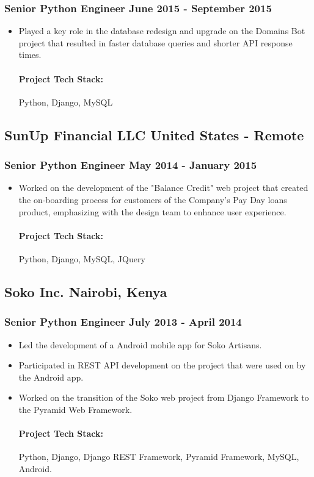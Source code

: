 \documentclass[11pt]{article} %
\begin{document}
\subsubsection{Senior Python Engineer \hfill  June 2015 - September 2015}
\begin{itemize}
    \item Played a key role in the database redesign and upgrade on the Domains Bot project that resulted in faster database queries and shorter API response times.

    \paragraph{Project Tech Stack:} Python, Django, MySQL
\end{itemize}

\subsection{SunUp Financial LLC \hfill United States - Remote}
\subsubsection{Senior Python Engineer \hfill  May 2014 - January 2015}
\begin{itemize}
    \item Worked on the development of the "Balance Credit" web project that created the on-boarding process for customers of the Company's Pay Day loans product, emphasizing with the design team to enhance user experience.

    \paragraph{Project Tech Stack:} Python, Django, MySQL, JQuery
\end{itemize}

\subsection{Soko Inc. \hfill Nairobi, Kenya}
\subsubsection{Senior Python Engineer \hfill  July 2013 - April 2014}
\begin{itemize}
    \item Led the development of a Android mobile app for Soko Artisans.
    \item Participated in REST API development on the project that were used on by the Android app.
    \item Worked on the transition of the Soko web project from Django Framework to the Pyramid Web Framework.

    \paragraph{Project Tech Stack:} Python, Django, Django REST Framework, Pyramid Framework, MySQL, Android.
\end{itemize}
\end{document}
